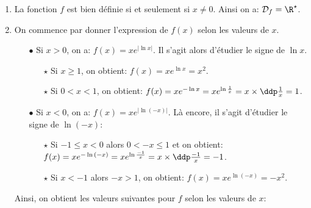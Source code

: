 \begin{correction}  \;
\begin{enumerate}
\item La fonction $f$ est bien d\'efinie si et seulement si $x\not= 0$. Ainsi on a: $\mathcal{D}_f=\R^{\star}$.
\item On commence par donner l'expression de $f(x)$ selon les valeurs de $x$. 
\begin{itemize}
\item[$\bullet$] Si $x>0$, on a: $f(x)=xe^{  |  \ln{x} | }$. Il s'agit alors d'\'etudier le signe de $\ln{x}$. 
\begin{itemize}
\item[$\star$] Si $x\geq 1$, on obtient: $f(x)=xe^{\ln{x}}=x^2$.
\item[$\star$] Si $0<x<1$, on obtient: $f(x)=xe^{ -\ln{x} }=xe^{\ln{ \frac{1}{x} }}=x\times \ddp\frac{1}{x}=1$.
\end{itemize}
\item[$\bullet$] Si $x<0$, on a: $f(x)=xe^{ | \ln{(-x)} | }$. L\`{a} encore, il s'agit d'\'etudier le signe de $\ln{(-x)}$:
\begin{itemize}
\item[$\star$] Si $-1 \leq x<0$ alors $0<-x\leq 1$ et on obtient: $f(x)=xe^{-\ln{(-x)}}=xe^{\ln{ \frac{-1}{x} }}=x\times \ddp\frac{-1}{x}=-1$.
\item[$\star$] Si $x<-1$ alors $-x>1$, on obtient: $f(x)=xe^{ \ln{(-x)} }=-x^2$.
\end{itemize}
\end{itemize}
Ainsi, on obtient les valeurs suivantes pour $f$ selon les valeurs de $x$:
\begin{center}
\end{center}

\end{enumerate}
\end{correction}



